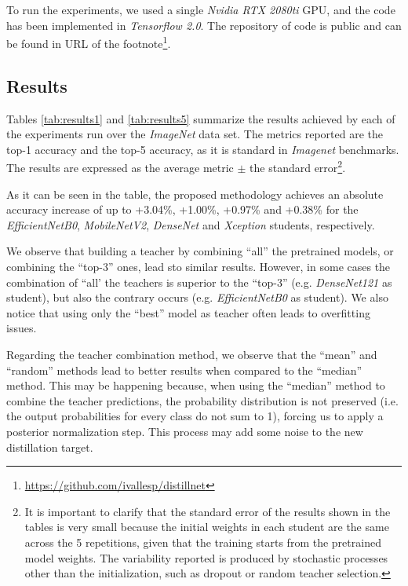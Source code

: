 \documentclass{elsarticle}
\begin{document}
	 To run the experiments, we used a single \textit{Nvidia RTX 2080ti} GPU, and the code has been implemented in \textit{Tensorflow 2.0}. The repository of code is public and can be found in URL of the footnote\footnote{\url{https://github.com/ivallesp/distillnet}}.
		
	\subsection{Results}  \label{sec:results}
	Tables \ref{tab:results1} and \ref{tab:results5} summarize the results achieved by each of the experiments run over the \textit{ImageNet} data set. The metrics reported are the top-1 accuracy and the top-5 accuracy, as it is standard in \textit{Imagenet} benchmarks. The results are expressed as the average metric $\pm$ the standard error\footnote{It is important to clarify that the standard error of the results shown in the tables is very small because the initial weights in each student are the same across the 5 repetitions, given that the training starts from the pretrained model weights. The variability reported is produced by stochastic processes other than the initialization, such as dropout or random teacher selection.}.  
	
	As it can be seen in the table, the proposed methodology achieves an absolute accuracy increase of up to +3.04\%, +1.00\%, +0.97\% and +0.38\% for the \textit{EfficientNetB0}, \textit{MobileNetV2},  \textit{DenseNet} and \textit{Xception} students, respectively. 
	
	We observe that building a teacher by combining ``all'' the pretrained models, or combining the ``top-3'' ones, lead sto similar results. However, in some cases the combination of ``all' the teachers is superior to the ``top-3'' (e.g. \textit{DenseNet121} as student), but also the contrary occurs (e.g. \textit{EfficientNetB0} as student). We also notice that using only the ``best'' model as teacher often leads to overfitting issues.  
	
	Regarding the teacher combination method, we observe that the ``mean'' and ``random'' methods lead to better results when compared to the ``median'' method. This may be happening because, when using the ``median'' method to combine the teacher predictions, the probability distribution is not preserved (i.e. the output probabilities for every class do not sum to 1), forcing us to apply a posterior normalization step. This process may add some noise to the new distillation target.
	
\end{document}
